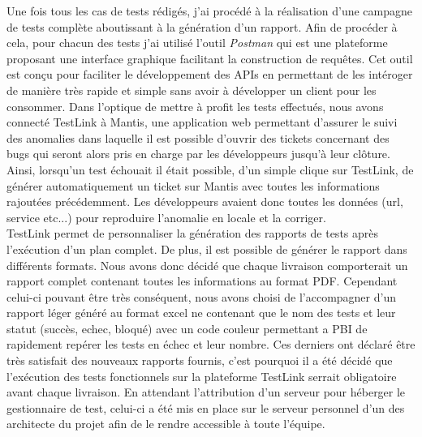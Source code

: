 	Une fois tous les cas de tests rédigés, j'ai procédé à la réalisation d'une campagne de tests complète aboutissant à la génération d'un rapport. Afin de procéder à cela, pour chacun des tests j'ai utilisé l'outil \textit{Postman} qui est une plateforme proposant une interface graphique facilitant la construction de requêtes. Cet outil est conçu pour faciliter le développement des APIs en permettant de les intéroger de manière très rapide et simple sans avoir à développer un client pour les consommer. Dans l'optique de mettre à profit les tests effectués, nous avons connecté TestLink à Mantis, une application web permettant d'assurer le suivi des anomalies dans laquelle il est possible d'ouvrir des tickets concernant des bugs qui seront alors pris en charge par les développeurs jusqu'à leur clôture. Ainsi, lorsqu'un test échouait il était possible, d'un simple clique sur TestLink, de générer automatiquement un ticket sur Mantis avec toutes les informations rajoutées précédemment. Les développeurs avaient donc toutes les données (url, service etc...) pour reproduire l'anomalie en locale et la corriger. \\
	
	TestLink permet de personnaliser la génération des rapports de tests après l'exécution d'un plan complet. De plus, il est possible de générer le rapport dans différents formats. Nous avons donc décidé que chaque livraison comporterait un rapport complet contenant toutes les informations au format PDF. Cependant celui-ci pouvant être très conséquent, nous avons choisi de l'accompagner d'un rapport léger généré au format excel ne contenant que le nom des tests et leur statut (succès, echec, bloqué) avec un code couleur permettant a PBI de rapidement repérer les tests en échec et leur nombre. Ces derniers ont déclaré être très satisfait des nouveaux rapports fournis, c'est pourquoi il a été décidé que l'exécution des tests fonctionnels sur la plateforme TestLink serrait obligatoire avant chaque livraison. En attendant l'attribution d'un serveur pour héberger le gestionnaire de test, celui-ci a été mis en place sur le serveur personnel d'un des architecte du projet afin de le rendre accessible à toute l'équipe. \\
	
